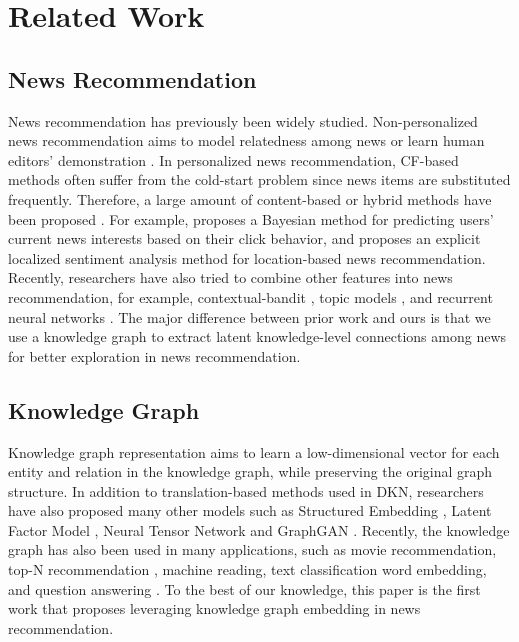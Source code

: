 \documentclass[sigconf]{acmart}
\begin{document}
        	

\section{Related Work}
	\subsection{News Recommendation}
		News recommendation has previously been widely studied.
		Non-personalized news recommendation aims to model relatedness among news \cite{lv2011learning} or learn human editors' demonstration \cite{wang2017dynamic}.
		In personalized news recommendation, CF-based methods \cite{wang2011collaborative} often suffer from the cold-start problem since news items are substituted frequently.
		Therefore, a large amount of content-based or hybrid methods have been proposed \cite{kompan2010content, liu2010personalized, bansal2015content, phelan2009using, son2013location}.
		For example, \cite{phelan2009using} proposes a Bayesian method for predicting users' current news interests based on their click behavior, and \cite{son2013location} proposes an explicit localized sentiment analysis method for location-based news recommendation.
		Recently, researchers have also tried to combine other features into news recommendation, for example, contextual-bandit \cite{li2010contextual}, topic models \cite{luostarinen2013using}, and recurrent neural networks \cite{okura2017embedding}.
		The major difference between prior work and ours is that we use a knowledge graph to extract latent knowledge-level connections among news for better exploration in news recommendation.
		
		
	\subsection{Knowledge Graph}
		Knowledge graph representation aims to learn a low-dimensional vector for each entity and relation in the knowledge graph, while preserving the original graph structure.
		In addition to translation-based methods \cite{bordes2013translating, wang2014knowledge, lin2015learning, ji2015knowledge} used in DKN, researchers have also proposed many other models such as Structured Embedding \cite{bordes2011learning}, Latent Factor Model \cite{jenatton2012latent}, Neural Tensor Network \cite{socher2013reasoning} and GraphGAN \cite{wang2017graphgan}.
		Recently, the knowledge graph has also been used in many applications, such as movie recommendation\cite{zhang2016collaborative}, top-N recommendation \cite{palumbo2017entity2rec}, machine reading\cite{yang2017leveraging}, text classification\cite{wang2017combining} word embedding\cite{xu2014rc}, and question answering \cite{dong2015question}.
		To the best of our knowledge, this paper is the first work that proposes leveraging knowledge graph embedding in news recommendation.
		
\end{document}
